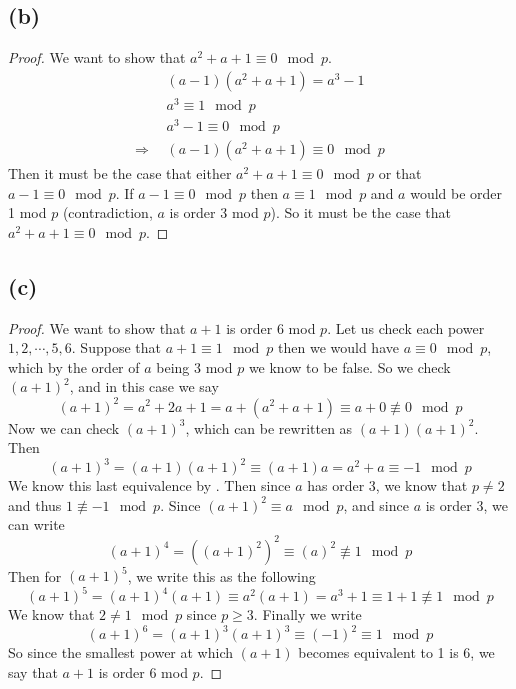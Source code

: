 \documentclass{article}
\theoremstyle{definition}
\begin{document}
\subsection*{(b)}
\begin{proof}
    We want to show that $a^2 + a + 1 \equiv 0 \mod{p}$.
    \begin{align*}
        & (a - 1)(a^2 + a + 1) = a^3 - 1 \\
        & a^3 \equiv 1 \mod{p} \\
        & a^3 - 1 \equiv 0 \mod{p} \\
        \Longrightarrow \ \ & (a - 1)(a^2 + a + 1) \equiv 0 \mod{p}
    \end{align*}
    Then it must be the case that either $a^2 + a + 1 \equiv 0 \mod{p}$ or that $a - 1 \equiv 0 \mod{p}$.
    If $a - 1 \equiv 0 \mod{p}$ then $a \equiv 1 \mod{p}$ and $a$ would be order 1 mod $p$ (contradiction, $a$ is order 3 mod $p$).
    So it must be the case that $a^2 + a + 1 \equiv 0 \mod{p}$.
\end{proof}
\subsection*{(c)}
\begin{proof}
    We want to show that $a + 1$ is order 6 mod $p$. Let us check each power $1,2,
    \cdots,5,6$. Suppose that $a + 1 \equiv 1 \mod{p}$ then we would have $a \equiv 0 \mod{p}$,
    which by the order of $a$ being 3 mod $p$ we know to be false. So we check 
    $(a+1)^2$, and in this case we say
    \[
        (a+1)^2 = a^2 + 2a + 1 = a + (a^2 + a + 1) \equiv a + 0 \not\equiv 0 \mod{p}
    \]
    Now we can check $(a+1)^3$, which can be rewritten as $(a+1)(a+1)^2$. Then
    \[
        (a+1)^3 = (a+1)(a+1)^2 \equiv (a+1)a = a^2 + a \equiv -1 \mod{p}
    \]
    We know this last equivalence by . Then since $a$ has order 3, we know that $p \neq 2$ and thus $1 \not\equiv -1 \mod{p}$.
    Since $(a+1)^2 \equiv a \mod{p}$, and since $a$ is order 3, we can write
    \[ (a+1)^4 = ((a+1)^2)^2 \equiv (a)^2 \not\equiv 1 \mod{p}\]
    Then for $(a+1)^5$, we write this as the following 
    \[
        (a+1)^5 = (a+1)^4(a+1) \equiv a^2(a+1) =a^3 + 1 \equiv 1 + 1 \not\equiv 1 \mod{p}
    \]
    We know that $2 \neq 1 \mod{p}$ since $p \geqslant 3$. Finally we write 
    \[
        (a+1)^6 = (a+1)^3(a+1)^3 \equiv (-1)^2 \equiv 1 \mod{p}
    \]
    So since the smallest power at which $(a+1)$ becomes equivalent to 1 is 6, we say that
    $a+1$ is order 6 mod $p$.
\end{proof}
\end{document}

